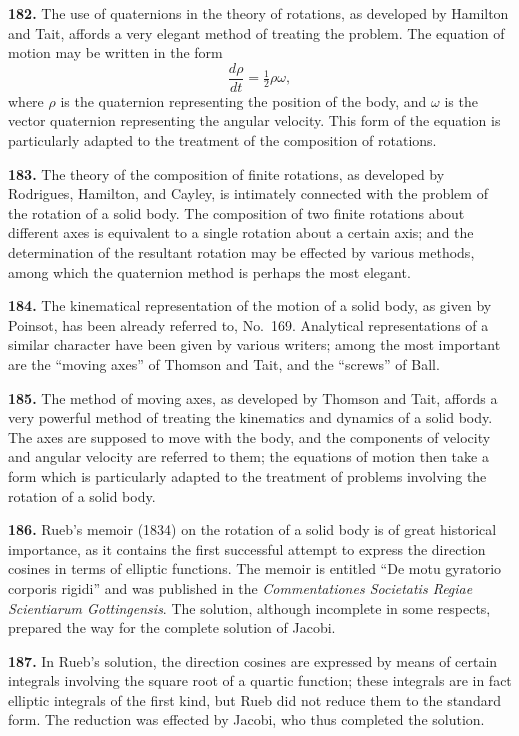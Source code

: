 \documentclass[11pt,a4paper]{article}
\theoremstyle{definition}
\begin{document}
\textbf{182.} The use of quaternions in the theory of rotations, as developed by Hamilton and Tait, affords a very elegant method of treating the problem. The equation of motion may be written in the form
\[
\frac{d\rho}{dt} = \tfrac{1}{2}\rho\omega,
\]
where $\rho$ is the quaternion representing the position of the body, and $\omega$ is the vector quaternion representing the angular velocity. This form of the equation is particularly adapted to the treatment of the composition of rotations.

\textbf{183.} The theory of the composition of finite rotations, as developed by Rodrigues, Hamilton, and Cayley, is intimately connected with the problem of the rotation of a solid body. The composition of two finite rotations about different axes is equivalent to a single rotation about a certain axis; and the determination of the resultant rotation may be effected by various methods, among which the quaternion method is perhaps the most elegant.

\textbf{184.} The kinematical representation of the motion of a solid body, as given by Poinsot, has been already referred to, No.~169. Analytical representations of a similar character have been given by various writers; among the most important are the ``moving axes'' of Thomson and Tait, and the ``screws'' of Ball.

\textbf{185.} The method of moving axes, as developed by Thomson and Tait, affords a very powerful method of treating the kinematics and dynamics of a solid body. The axes are supposed to move with the body, and the components of velocity and angular velocity are referred to them; the equations of motion then take a form which is particularly adapted to the treatment of problems involving the rotation of a solid body.

\textbf{186.} Rueb's memoir (1834) on the rotation of a solid body is of great historical importance, as it contains the first successful attempt to express the direction cosines in terms of elliptic functions. The memoir is entitled ``De motu gyratorio corporis rigidi'' and was published in the \textit{Commentationes Societatis Regiae Scientiarum Gottingensis}. The solution, although incomplete in some respects, prepared the way for the complete solution of Jacobi.

\textbf{187.} In Rueb's solution, the direction cosines are expressed by means of certain integrals involving the square root of a quartic function; these integrals are in fact elliptic integrals of the first kind, but Rueb did not reduce them to the standard form. The reduction was effected by Jacobi, who thus completed the solution.
\end{document}
